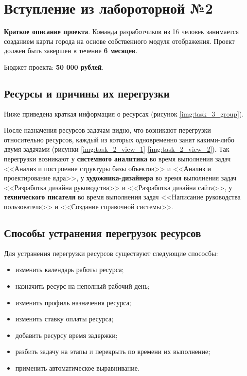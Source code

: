 \chapter{Вступление из лабороторной №2}

\textbf{Краткое описание проекта}. Команда разработчиков из 16 человек занимается созданием карты
города на основе собственного модуля отображения. Проект должен быть завершен в течение
\textbf{6 месяцев}. 

Бюджет проекта: \textbf{50 000 рублей}.

\section{Ресурсы и причины их перегрузки}

Ниже приведена краткая информация о ресурсах (рисунок \ref{img:task_3_group}).

После назначения ресурсов задачам видно, что возникают перегрузки относительно ресурсов, каждый из которых
одновременно занят какими-либо двумя задачами (рисунки \ref{img:task_2_view_1}-\ref{img:task_2_view_2}).
Так перегрузки возникают у \textbf{системного аналитика} во время выполнения задач <<Анализ и построение структуры базы объектов>> и <<Анализ и проектирование ядра>>, у \textbf{художника-дизайнера} во время выполнения задач <<Разработка дизайна руководства>> и <<Разработка дизайна сайта>>, у \textbf{технического писателя} во время выполнения задач <<Написание руководства пользователя>> и <<Создание справочной системы>>.

\section{Способы устранения перегрузок ресурсов}

Для устранения перегрузки ресурсов существуют следующие спососбы:
\begin{itemize}[label = ---]
	\item изменить календарь работы ресурса;
	\item назначить ресурс на неполный рабочий день;
	\item изменить профиль назначения ресурса;
	\item изменить ставку оплаты ресурса;
	\item добавить ресурсу время задержки;
	\item разбить задачу на этапы и перекрыть по времени их выполнение;
	\item применить автоматическое выравнивание.
\end{itemize}
